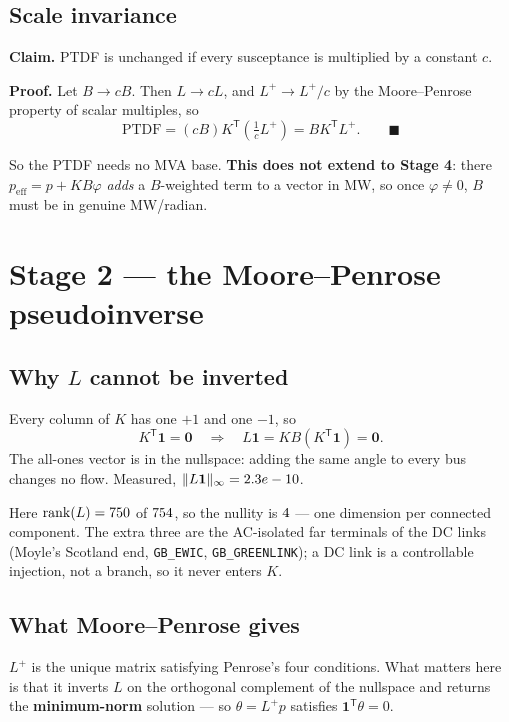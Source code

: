 \documentclass[11pt,a4paper]{article}
\newcommand{\T}{^{\mathsf{T}}}
\newcommand{\Lp}{L^{+}}
\begin{document}
\subsection*{Scale invariance}

\textbf{Claim.} PTDF is unchanged if every susceptance is multiplied by a
constant $c$.

\textbf{Proof.} Let $B \to cB$. Then $L \to cL$, and $\Lp \to \Lp/c$ by the
Moore--Penrose property of scalar multiples, so
\[
  \text{PTDF} = (cB)K\T\!\left(\tfrac{1}{c}\Lp\right) = B K\T \Lp . \qquad\blacksquare
\]

So the PTDF needs no MVA base. \textbf{This does not extend to Stage 4}: there
$p_{\text{eff}} = p + KB\varphi$ \emph{adds} a $B$-weighted term to a vector in
MW, so once $\varphi \neq 0$, $B$ must be in genuine MW/radian.

\newpage
\section{Stage 2 --- the Moore--Penrose pseudoinverse}

\subsection*{Why $L$ cannot be inverted}

Every column of $K$ has one $+1$ and one $-1$, so
\begin{equation}
  K\T\mathbf{1} = \mathbf{0}
  \quad\Longrightarrow\quad
  L\mathbf{1} = K B (K\T \mathbf{1}) = \mathbf{0}.
\end{equation}
The all-ones vector is in the nullspace: adding the same angle to every bus
changes no flow. Measured, $\|L\mathbf{1}\|_\infty = 2.3e-10$.

Here $\operatorname{rank}(L) = 750$ of $754$, so the nullity is $4$ ---
one dimension per connected component. The extra three are the AC-isolated far
terminals of the DC links (Moyle's Scotland end, \texttt{GB\_EWIC},
\texttt{GB\_GREENLINK}); a DC link is a controllable injection, not a branch,
so it never enters $K$.

\subsection*{What Moore--Penrose gives}

$\Lp$ is the unique matrix satisfying Penrose's four conditions. What matters
here is that it inverts $L$ on the orthogonal complement of the nullspace and
returns the \textbf{minimum-norm} solution --- so $\theta = \Lp p$ satisfies
$\mathbf{1}\T\theta = 0$.
\end{document}
